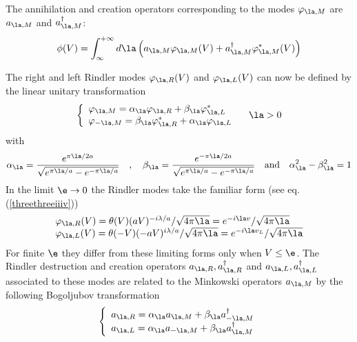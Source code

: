 \documentclass[12pt]{article}
\begin{document}
The  annihilation and creation operators corresponding to
the modes $ \varphi_{\la,M}$ are $a_{\la,M}$ and $a_{\la,M}^\dagger $:
\begin{equation} \phi(V) =\int_{\infty}^{+\infty} d\la \left( a_{\la,M}
\varphi_{\la,M}(V) + a_{\la,M}^{\dagger} \varphi^*_{\la,M}
(V)\right)
 \end{equation}

The right and left Rindler modes  $\varphi_{\la,R} (V)$ and $\varphi_{\la,L}
(V)$ can now be defined by the linear unitary
transformation
\begin{equation}
\left\{
\begin{array}{ll} \varphi_{\la , M} = \alpha_{\la} \varphi_{\la,R} +
\beta_{\la} \varphi_{\la,L}^* \\ \varphi_{- \la , M} = \beta_{\la}
\varphi_{\la,R}^* + \alpha_{\la} \varphi_{\la,L} 
\end{array} \right. \quad \la>0 \label{threethreex} \end{equation}
with
\begin{equation}  \alpha_{\la} = { e^{\pi \la / 2 a} \over \sqrt { e^{\pi \la
/ a} - e^{- \pi \la / a}}} \quad , \quad
 \beta_{\la} =  { e^{-\pi \la / 2 a} \over
\sqrt { e^{\pi \la / a} - e^{- \pi \la / a}}}
\quad \mbox{and} \quad \alpha_{\la}^2 -
\beta_{\la}^2 = 1 \label{threethreexi}
\end{equation}
In the limit $\e \rightarrow 0$ the
Rindler modes take the familiar form (see eq. (\ref{threethreeiiiv}))
\begin{equation} \begin{array}{ll} \varphi_{\la,R} (V) =
\theta(V) (aV)^{-i\lambda/a} /{ \sqrt{4 \pi \la}}
 =
 e^{-i\la v}/\sqrt{4 \pi \la} \\ \varphi_{\la,L} (V) =
\theta(-V) (-aV)^{i\lambda/a}/{ \sqrt{4 \pi \la}} =
 e^{-i\la v_L}/\sqrt{4 \pi \la}
\end{array}
\label{threethreexii} \end{equation}
For finite $\e$ they differ from these
limiting forms only
when $V \leq \e$.
The Rindler destruction and creation operators $a_{\la,R},
a_{\la,R}^\dagger $ and $a_{\la,L}, a_{\la,L}^\dagger $
associated to these modes are related to the Minkowski operators $a_{\la,M}$
by the following Bogoljubov transformation
\begin{equation}
\left\{
\begin{array}{ll}
a_{\la,R}  = \alpha_{\la} a_{\la,M} + \beta_{\la} a_{-\la,M}^{\dagger}\\
a_{\la,L} = \alpha_{\la} a_{-\la,M} + \beta_{\la}
a_{\la,M}^{\dagger}\label{threethreeixbog} \end{array} \right.\end{equation}
\end{document}
